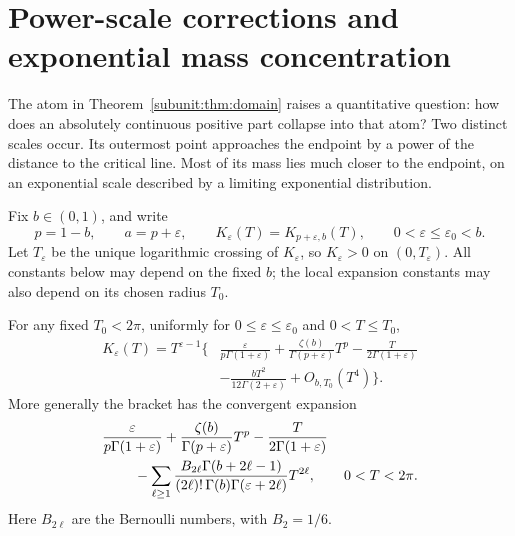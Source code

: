 \section{Power-scale corrections and exponential mass concentration}
\label{rwbound:real:sec:boundary}

The atom in Theorem~\ref{subunit:thm:domain} raises a quantitative
question: how does an absolutely continuous positive part collapse into
that atom? Two distinct scales occur. Its outermost point approaches the
endpoint by a power of the distance to the critical line. Most of its
mass lies much closer to the endpoint, on an exponential scale described
by a limiting exponential distribution.

Fix $b\in(0,1)$, and write
\begin{equation}\label{rwbound:real:eq:boundary-parameters}
 p=1-b,\qquad a=p+\varepsilon,\qquad
 K_\varepsilon(T)=K_{p+\varepsilon,b}(T),\qquad
 0<\varepsilon\leq\varepsilon_0<b.
\end{equation}
Let $T_\varepsilon$ be the unique logarithmic crossing of
$K_\varepsilon$, so $K_\varepsilon>0$ on $(0,T_\varepsilon)$.
All constants below may depend on the fixed $b$; the local expansion
constants may also depend on its chosen radius $T_0$.

\begin{lemma}
\label{rwbound:real:lem:boundary-expansion}
For any fixed $T_0<2\pi$, uniformly for
$0\leq\varepsilon\leq\varepsilon_0$ and $0<T\leq T_0$,
\begin{equation}\label{rwbound:real:eq:boundary-expansion}
\begin{split}
 K_\varepsilon(T)=T^{\varepsilon-1}\biggl\{
 &\frac{\varepsilon}{p\Gamma(1+\varepsilon)}
 +\frac{\zeta(b)}{\Gamma(p+\varepsilon)}T^p
 -\frac{T}{2\Gamma(1+\varepsilon)}\\
 &-\frac{bT^2}{12\Gamma(2+\varepsilon)}+O_{b,T_0}(T^4)
 \biggr\}.
\end{split}
\end{equation}
More generally the bracket has the convergent expansion
\begin{equation}\label{rwbound:real:eq:boundary-series}
\begin{split}
 &\frac{\varepsilon}{p\Gamma(1+\varepsilon)}
 +\frac{\zeta(b)}{\Gamma(p+\varepsilon)}T^p
 -\frac{T}{2\Gamma(1+\varepsilon)}\\
 &\hspace{8mm}
 -\sum_{\ell\geq1}\frac{B_{2\ell}\Gamma(b+2\ell-1)}
 {(2\ell)!\,\Gamma(b)\Gamma(\varepsilon+2\ell)}T^{2\ell},
 \qquad 0<T<2\pi.
\end{split}
\end{equation}
Here $B_{2\ell}$ are the Bernoulli numbers, with $B_2=1/6$.
\end{lemma}

